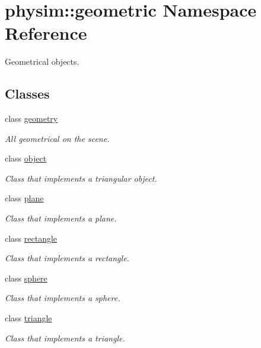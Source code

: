\hypertarget{namespacephysim_1_1geometric}{}\section{physim\+:\+:geometric Namespace Reference}
\label{namespacephysim_1_1geometric}


Geometrical objects.  


\subsection*{Classes}
\begin{DoxyCompactItemize}
\item 
class \hyperlink{classphysim_1_1geometric_1_1geometry}{geometry}
\begin{DoxyCompactList}\small\item\em All geometrical on the scene. \end{DoxyCompactList}\item 
class \hyperlink{classphysim_1_1geometric_1_1object}{object}
\begin{DoxyCompactList}\small\item\em Class that implements a triangular object. \end{DoxyCompactList}\item 
class \hyperlink{classphysim_1_1geometric_1_1plane}{plane}
\begin{DoxyCompactList}\small\item\em Class that implements a plane. \end{DoxyCompactList}\item 
class \hyperlink{classphysim_1_1geometric_1_1rectangle}{rectangle}
\begin{DoxyCompactList}\small\item\em Class that implements a rectangle. \end{DoxyCompactList}\item 
class \hyperlink{classphysim_1_1geometric_1_1sphere}{sphere}
\begin{DoxyCompactList}\small\item\em Class that implements a sphere. \end{DoxyCompactList}\item 
class \hyperlink{classphysim_1_1geometric_1_1triangle}{triangle}
\begin{DoxyCompactList}\small\item\em Class that implements a triangle. \end{DoxyCompactList}\end{DoxyCompactItemize}
